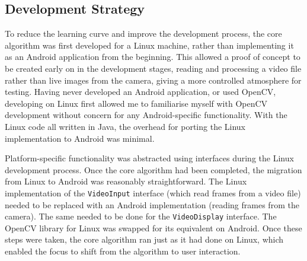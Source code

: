 \subsection{Development Strategy}

To reduce the learning curve and improve the development process, the core algorithm was first developed for a Linux machine, rather than implementing it as an Android application from the beginning. This allowed a proof of concept to be created early on in the development stages, reading and processing a video file rather than live images from the camera, giving a more controlled atmosphere for testing. Having never developed an Android application, or used OpenCV, developing on Linux first allowed me to familiarise myself with OpenCV development without concern for any Android-specific functionality. With the Linux code all written in Java, the overhead for porting the Linux implementation to Android was minimal.

Platform-specific functionality was abstracted using interfaces during the Linux development process. Once the core algorithm had been completed, the migration from Linux to Android was reasonably straightforward. The Linux implementation of the \texttt{VideoInput} interface (which read frames from a video file) needed to be replaced with an Android implementation (reading frames from the camera). The same needed to be done for the \texttt{VideoDisplay} interface. The OpenCV library for Linux was swapped for its equivalent on Android. Once these steps were taken, the core algorithm ran just as it had done on Linux, which enabled the focus to shift from the algorithm to user interaction.